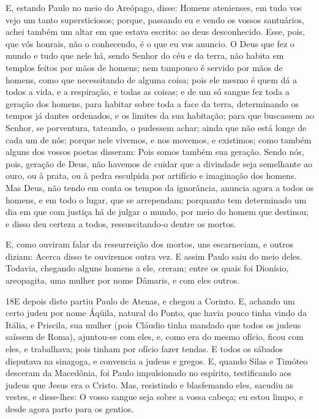 E, estando Paulo no meio do Areópago, disse: Homens atenienses,
em tudo vos vejo um tanto supersticiosos; porque, passando eu
e vendo os vossos santuários, achei também um altar em que estava
escrito: ao deus desconhecido. Esse, pois, que vós honrais, não o
conhecendo, é o que eu vos anuncio. O Deus que fez o mundo e
tudo que nele há, sendo Senhor do céu e da terra, não habita em
templos feitos por mãos de homens; nem tampouco é servido por
mãos de homens, como que necessitando de alguma coisa; pois ele
mesmo é quem dá a todos a vida, e a respiração, e todas as coisas;
e de um só sangue fez toda a geração dos homens, para habitar
sobre toda a face da terra, determinando os tempos já dantes
ordenados, e os limites da sua habitação; para que buscassem
ao Senhor, se porventura, tateando, o pudessem achar; ainda que não
está longe de cada um de nós; porque nele vivemos, e nos
movemos, e existimos; como também alguns dos vossos poetas disseram:
Pois somos também sua geração. Sendo nós, pois, geração de
Deus, não havemos de cuidar que a divindade seja semelhante ao ouro,
ou à prata, ou à pedra esculpida por artifício e imaginação dos
homens. Mas Deus, não tendo em conta os tempos da ignorância,
anuncia agora a todos os homens, e em todo o lugar, que se
arrependam; porquanto tem determinado um dia em que com
justiça há de julgar o mundo, por meio do homem que destinou; e
disso deu certeza a todos, ressuscitando-o dentre os mortos.

E, como ouviram falar da ressurreição dos mortos, uns
escarneciam, e outros diziam: A\-cer\-ca disso te ouviremos outra vez.
E assim Paulo saiu do meio deles. Todavia, chegando
alguns homens a ele, creram; entre os quais foi Dionísio,
areopagita, uma mulher por nome Dâmaris, e com eles outros.

\medskip

\lettrine{18} E depois disto partiu Paulo de Atenas, e chegou
a Corinto. E, achando um certo judeu por nome Áqüila, natural do
Ponto, que havia pouco tinha vindo da Itália, e Priscila, sua mulher
(pois Cláudio tinha mandado que todos os judeus saíssem de Roma),
ajuntou-se com eles, e, como era do mesmo ofício, ficou com
eles, e trabalhava; pois tinham por ofício fazer tendas. E todos
os sábados disputava na sinagoga, e convencia a judeus e gregos.
E, quando Silas e Timóteo desceram da Macedônia, foi Paulo
impulsionado no espírito, testificando aos judeus que Jesus era o
Cristo. Mas, resistindo e blasfemando eles, sacudiu as vestes, e
disse-lhes: O vosso sangue seja sobre a vossa cabeça; eu estou
limpo, e desde agora parto para os gentios.

